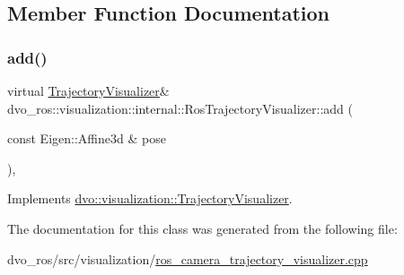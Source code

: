 \subsection{Member Function Documentation}
\mbox{\label{classdvo__ros_1_1visualization_1_1internal_1_1_ros_trajectory_visualizer_acd66991b88e68e9843028cb5cb65c29a}} 
\subsubsection{\texorpdfstring{add()}{add()}}
{\footnotesize\ttfamily virtual \mbox{\hyperlink{classdvo_1_1visualization_1_1_trajectory_visualizer}{Trajectory\+Visualizer}}\& dvo\+\_\+ros\+::visualization\+::internal\+::\+Ros\+Trajectory\+Visualizer\+::add (\begin{DoxyParamCaption}\item[{const Eigen\+::\+Affine3d \&}]{pose }\end{DoxyParamCaption})\hspace{0.3cm}{\ttfamily [inline]}, {\ttfamily [virtual]}}



Implements \mbox{\hyperlink{classdvo_1_1visualization_1_1_trajectory_visualizer_ac41106ae7e28c019b03f0aa210c6f0c1}{dvo\+::visualization\+::\+Trajectory\+Visualizer}}.



The documentation for this class was generated from the following file\+:\begin{DoxyCompactItemize}
\item 
dvo\+\_\+ros/src/visualization/\mbox{\hyperlink{ros__camera__trajectory__visualizer_8cpp}{ros\+\_\+camera\+\_\+trajectory\+\_\+visualizer.\+cpp}}\end{DoxyCompactItemize}
